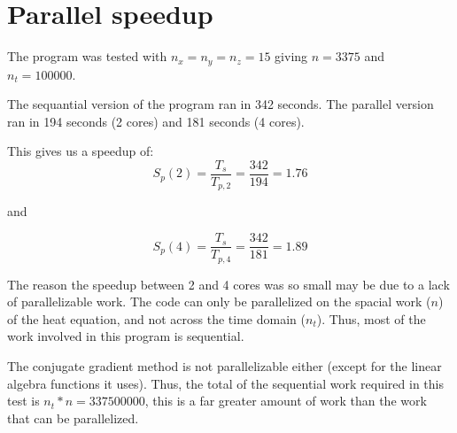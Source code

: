 \section{Parallel speedup}

The program was tested with $n_x=n_y=n_z=15$ giving $n=3375$ and $n_t=100000$.

The sequantial version of the program ran in 342 seconds. 
The parallel version ran in 194 seconds (2 cores) and 181 seconds (4 cores).

This gives us a speedup of:
\begin{equation}
S_p(2) = \frac{T_s}{T_{p,2}} = \frac{342}{194} = 1.76
\end{equation}

and

\begin{equation}
S_p(4) = \frac{T_s}{T_{p,4}} = \frac{342}{181} = 1.89
\end{equation}

The reason the speedup between 2 and 4 cores was so small may be due to a lack of
parallelizable work. The code can only be parallelized on the spacial work ($n$) of the
heat equation, and not across the time domain ($n_t$). Thus, most of the work involved in
this program is sequential.

The conjugate gradient method is not parallelizable either (except for the linear algebra functions it
uses). Thus, the total of the sequential work required in this test is $n_t * n = 337500000$, this is a far greater amount of
work than the work that can be parallelized.
